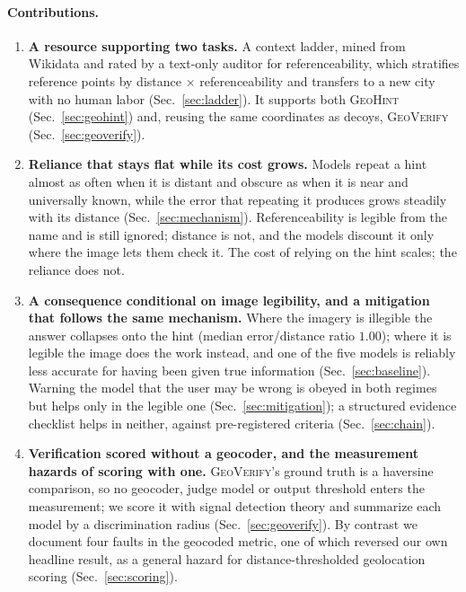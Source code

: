 \documentclass[10pt,a4paper]{article}
\begin{document}
\paragraph{Contributions.}
\begin{enumerate}
  \item \textbf{A resource supporting two tasks.} A context ladder, mined from
  Wikidata and rated by a text-only auditor for referenceability, which
  stratifies reference points by distance $\times$ referenceability and
  transfers to a new city with no human labor (Sec.~\ref{sec:ladder}). It
  supports both \textsc{GeoHint} (Sec.~\ref{sec:geohint}) and, reusing the same
  coordinates as decoys, \textsc{GeoVerify} (Sec.~\ref{sec:geoverify}).

  \item \textbf{Reliance that stays flat while its cost grows.} Models repeat a
  hint almost as often when it is distant and obscure as when it is near and
  universally known, while the error that repeating it produces grows steadily
  with its distance (Sec.~\ref{sec:mechanism}). Referenceability is legible
  from the name and is still ignored; distance is not, and the models discount
  it only where the image lets them check it. The cost of relying on the hint
  scales; the reliance does not.

  \item \textbf{A consequence conditional on image legibility, and a mitigation
  that follows the same mechanism.} Where the imagery is illegible the answer
  collapses onto the hint (median error/distance ratio $1.00$); where it is
  legible the image does the work instead, and one of the five models is
  reliably less accurate for having been given true information
  (Sec.~\ref{sec:baseline}). Warning the model that the user may be wrong is
  obeyed in both regimes but helps only in the legible one
  (Sec.~\ref{sec:mitigation}); a structured evidence checklist helps in neither,
  against pre-registered criteria (Sec.~\ref{sec:chain}).

  \item \textbf{Verification scored without a geocoder, and the measurement
  hazards of scoring with one.} \textsc{GeoVerify}'s ground truth is a haversine
  comparison, so no geocoder, judge model or output threshold enters the
  measurement; we score it with signal detection theory and summarize each model
  by a discrimination radius (Sec.~\ref{sec:geoverify}). By contrast we document
  four faults in the geocoded metric, one of which reversed our own headline
  result, as a general hazard for distance-thresholded geolocation scoring
  (Sec.~\ref{sec:scoring}).
\end{enumerate}
\end{document}
